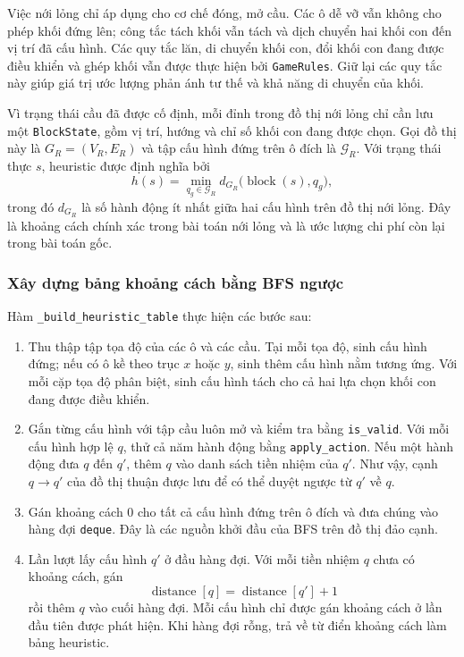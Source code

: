 Việc nới lỏng chỉ áp dụng cho cơ chế đóng, mở cầu. Các ô dễ vỡ vẫn
không cho phép khối đứng lên; công tắc tách khối vẫn tách và dịch
chuyển hai khối con đến vị trí đã cấu hình. Các quy tắc lăn, di chuyển
khối con, đổi khối con đang được điều khiển và ghép khối vẫn được
thực hiện bởi \texttt{GameRules}. Giữ lại các quy tắc này giúp giá trị
ước lượng phản ánh tư thế và khả năng di chuyển của khối.

Vì trạng thái cầu đã được cố định, mỗi đỉnh trong đồ thị nới lỏng chỉ
cần lưu một \texttt{BlockState}, gồm vị trí, hướng và chỉ số khối con
đang được chọn. Gọi đồ thị này là
$G_R = (V_R, E_R)$ và tập cấu hình đứng trên ô đích là
$\mathcal{G}_R$. Với trạng thái thực $s$, heuristic được định nghĩa bởi
\[
    h(s) = \min_{q_g \in \mathcal{G}_R}
    d_{G_R}\bigl(\operatorname{block}(s), q_g\bigr),
\]
trong đó $d_{G_R}$ là số hành động ít nhất giữa hai cấu hình trên đồ
thị nới lỏng. Đây là khoảng cách chính xác trong bài toán nới lỏng và
là ước lượng chi phí còn lại trong bài toán gốc.

\subsubsection{Xây dựng bảng khoảng cách bằng BFS ngược}
Hàm \texttt{\_build\_heuristic\_table} thực hiện các bước sau:
\begin{enumerate}
    \item Thu thập tập tọa độ của các ô và các cầu. Tại mỗi tọa độ,
    sinh cấu hình đứng; nếu có ô kề theo trục $x$ hoặc $y$, sinh thêm
    cấu hình nằm tương ứng. Với mỗi cặp tọa độ phân biệt, sinh cấu
    hình tách cho cả hai lựa chọn khối con đang được điều khiển.

    \item Gắn từng cấu hình với tập cầu luôn mở và kiểm tra bằng
    \texttt{is\_valid}. Với mỗi cấu hình hợp lệ $q$, thử cả năm hành
    động bằng \texttt{apply\_action}. Nếu một hành động đưa $q$ đến
    $q'$, thêm $q$ vào danh sách tiền nhiệm của $q'$. Như vậy, cạnh
    $q \to q'$ của đồ thị thuận được lưu để có thể duyệt ngược từ
    $q'$ về $q$.

    \item Gán khoảng cách $0$ cho tất cả cấu hình đứng trên ô đích và
    đưa chúng vào hàng đợi \texttt{deque}. Đây là các nguồn khởi đầu
    của BFS trên đồ thị đảo cạnh.

    \item Lần lượt lấy cấu hình $q'$ ở đầu hàng đợi. Với mỗi tiền
    nhiệm $q$ chưa có khoảng cách, gán
    \[
        \operatorname{distance}[q]
        = \operatorname{distance}[q'] + 1
    \]
    rồi thêm $q$ vào cuối hàng đợi. Mỗi cấu hình chỉ được gán khoảng
    cách ở lần đầu tiên được phát hiện. Khi hàng đợi rỗng, trả về từ
    điển khoảng cách làm bảng heuristic.
\end{enumerate}

